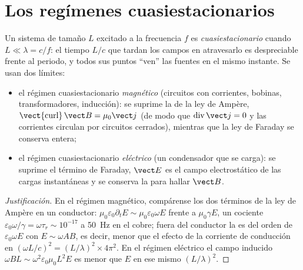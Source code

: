 \section{Los regímenes cuasiestacionarios}

\begin{definition}\label{def:b2:maxwell-equations:arqs}
Un sistema de tamaño $L$ excitado a la frecuencia $f$ es
\emph{cuasiestacionario} cuando $L \ll \lambda = c/f$: el tiempo $L/c$ que
tardan los campos en atravesarlo es despreciable frente al periodo, y
todos sus puntos ``ven'' las fuentes en el mismo instante. Se usan dos límites:
\begin{itemize}
  \item el régimen cuasiestacionario \emph{magnético} (circuitos con
        corrientes, bobinas, transformadores, inducción): se suprime la
         de la ley de Ampère, $\operatorname{\vect{curl}}\vect B
        = \mu_0\vect j$ (de modo que $\operatorname{div}\vect j = 0$ y las
        corrientes circulan por circuitos cerrados), mientras que la ley de
        Faraday se conserva entera;
  \item el régimen cuasiestacionario \emph{eléctrico} (un condensador que
        se carga): se suprime el término de Faraday, $\vect E$ es el campo
        electrostático de las cargas instantáneas y se conserva la
         para hallar $\vect B$.
\end{itemize}
\end{definition}

\begin{proof}[Justificación]
En el régimen magnético, compárense los dos términos de la ley de Ampère
en un conductor: $\mu_0\varepsilon_0\partial_t E \sim \mu_0\varepsilon_0\omega E$ frente a $\mu_0\gamma E$,
un cociente $\varepsilon_0\omega/\gamma = \omega\tau_r \sim 10^{-17}$ a \qty{50}{Hz} en el cobre;
fuera del conductor la  es del orden de
$\varepsilon_0\omega E$ con $E \sim \omega AB$, es decir, menor que el efecto de la
corriente de conducción en $(\omega L/c)^2 = (L/\lambda)^2 \times 4\pi^2$. En el
régimen eléctrico el campo inducido $\omega BL \sim \omega^2\varepsilon_0\mu_0L^2E$ es menor que $E$
en ese mismo $(L/\lambda)^2$.
\end{proof}

